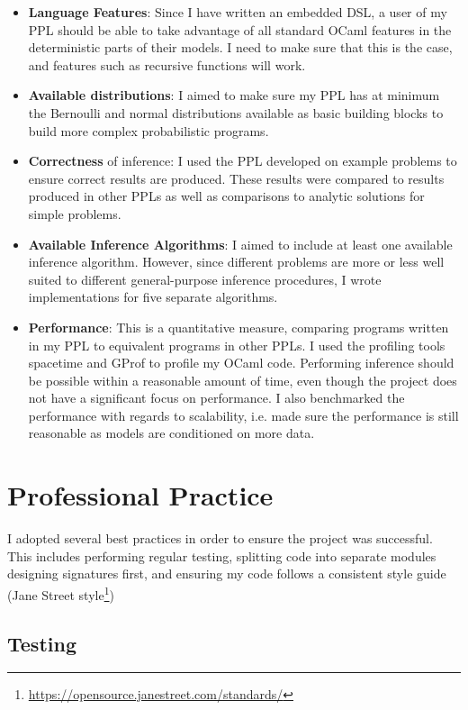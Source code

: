 \begin{itemize}
	\item \textbf{Language Features}: Since I have written an embedded DSL, a user of my PPL should be able to take advantage of all standard OCaml features in the deterministic parts of their models. I need to make sure that this is the case, and features such as recursive functions will work.
	\item \textbf{Available distributions}: I aimed to make sure my PPL has at minimum the Bernoulli and normal distributions available as basic building blocks to build more complex probabilistic programs.
	\item \textbf{Correctness} of inference: I used the PPL developed on example problems to ensure correct results are produced. These results were compared to results produced in other PPLs as well as comparisons to analytic solutions for simple problems.
	\item \textbf{Available Inference Algorithms}: I aimed to include at least one available inference algorithm. However, since different problems are more or less well suited to different general-purpose inference procedures, I wrote implementations for five separate algorithms.
	\item \textbf{Performance}: This is a quantitative measure, comparing programs written in my PPL to equivalent programs in other PPLs. I used the profiling tools spacetime and GProf to profile my OCaml code. Performing inference should be possible within a reasonable amount of time, even though the project does not have a significant focus on performance. I also benchmarked the performance with regards to scalability, i.e. made sure the performance is still reasonable as models are conditioned on more data.
\end{itemize}

\section{Professional Practice}

I adopted several best practices in order to ensure the project was successful. This includes performing regular testing, splitting code into separate modules designing signatures first, and ensuring my code follows a consistent style guide (Jane Street style\footnote{\url{https://opensource.janestreet.com/standards/}})

\subsection{Testing}


